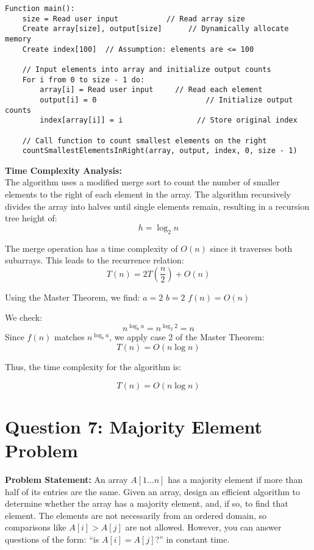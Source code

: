 \documentclass[a4paper,12pt]{report}
\begin{document}
\begin{tcolorbox}[colback=white, colframe=black, boxrule=0.5pt]
\begin{verbatim}
Function main():
    size = Read user input           // Read array size
    Create array[size], output[size]      // Dynamically allocate memory
    Create index[100]  // Assumption: elements are <= 100

    // Input elements into array and initialize output counts
    For i from 0 to size - 1 do:
        array[i] = Read user input     // Read each element
        output[i] = 0                         // Initialize output counts
        index[array[i]] = i                 // Store original index

    // Call function to count smallest elements on the right
    countSmallestElementsInRight(array, output, index, 0, size - 1)
\end{verbatim}
\end{tcolorbox}

\large \textbf{Time Complexity Analysis:} \hfill \\

The algorithm uses a modified merge sort to count the number of smaller elements to the right of each element in the array. The algorithm recursively divides the array into halves until single elements remain, resulting in a recursion tree height of:
\[
h = \log_2 n
\]

The merge operation has a time complexity of \(O(n)\) since it traverses both subarrays. This leads to the recurrence relation:
\[
T(n) = 2T\left(\frac{n}{2}\right) + O(n)
\]

Using the Master Theorem, we find:
\(a = 2\)
\(b = 2\)
\(f(n) = O(n)\)

We check:
\[
n^{\log_b a} = n^{\log_2 2} = n
\]
Since \(f(n)\) matches \(n^{\log_b a}\), we apply case 2 of the Master Theorem:
\[
T(n) = O(n \log n)
\]

Thus, the time complexity for the algorithm is:
\begin{tcolorbox}[colback=white, colframe=black, boxrule=0.5pt] %
\[
T(n) = O(n \log n)
\]
\end{tcolorbox}

\section*{Question 7: Majority Element Problem}
\textbf{Problem Statement:} 
An array \( A[1...n] \) has a majority element if more than half of its entries are the same. Given an array, design an efficient algorithm to determine whether the array has a majority element, and, if so, to find that element. The elements are not necessarily from an ordered domain, so comparisons like \( A[i] > A[j] \) are not allowed. However, you can answer questions of the form: “is \( A[i] = A[j] \)?” in constant time.
\end{document}
